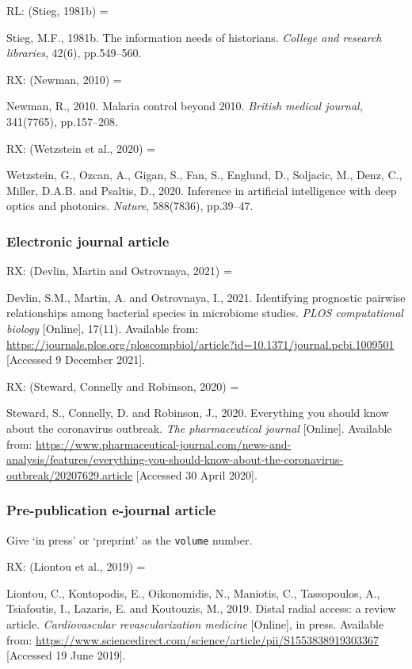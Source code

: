 RL: (Stieg, 1981b) = \cite{stieg1981inh}

Stieg, M.F., 1981b. The information needs of historians. \emph{College and research libraries}, 42(6), pp.549--560.


RX: (Newman, 2010) = \cite{newman2010mcb}

Newman, R., 2010. Malaria control beyond 2010. \emph{British medical journal}, 341(7765), pp.157--208.


RX: (Wetzstein et al., 2020) = \cite{wetzstein.etal2020iai}

Wetzstein, G., Ozcan, A., Gigan, S., Fan, S., Englund, D., Soljacic, M., Denz, C., Miller, D.A.B. and Psaltis, D., 2020. Inference in artificial intelligence with deep optics and photonics. \emph{Nature}, 588(7836), pp.39--47.



\subsubsection*{Electronic journal article}

RX: (Devlin, Martin and Ostrovnaya, 2021) = \cite{devlin.etal2021ipp}

Devlin, S.M., Martin, A. and Ostrovnaya, I., 2021. Identifying prognostic pairwise relationships among bacterial species in microbiome studies. \emph{PLOS computational biology} [Online], 17(11). Available from: \url{https://journals.plos.org/ploscompbiol/article?id=10.1371/journal.pcbi.1009501} [Accessed 9 December 2021].


RX: (Steward, Connelly and Robinson, 2020) = \cite{steward.etal2020eys}

Steward, S., Connelly, D. and Robinson, J., 2020. Everything you should know about the coronavirus outbreak. \emph{The pharmaceutical journal} [Online]. Available from: \url{https://www.pharmaceutical-journal.com/news-and-analysis/features/everything-you-should-know-about-the-coronavirus-outbreak/20207629.article} [Accessed 30 April 2020].



\subsubsection*{Pre-publication e-journal article}

Give `in press' or `preprint' as the \texttt{volume} number.

RX: (Liontou et al., 2019) = \cite{liontou.etal2019dra}

Liontou, C., Kontopodis, E., Oikonomidis, N., Maniotis, C., Tassopoulos, A., Tsiafoutis, I., Lazaris, E. and Koutouzis, M., 2019. Distal radial access: a review article. \emph{Cardiovascular revascularization medicine} [Online], in press. Available from: \url{https://www.sciencedirect.com/science/article/pii/S1553838919303367} [Accessed 19 June 2019].



